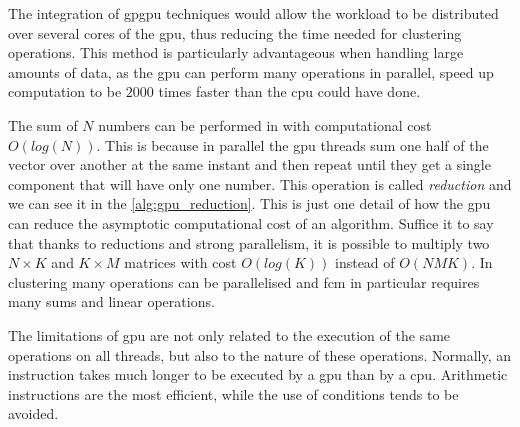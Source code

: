 \bigskip
The integration of \gls{gpgpu} techniques would allow the workload to be distributed over several cores of the \gls{gpu}, thus reducing the time needed for clustering operations. This method is particularly advantageous when handling large amounts of data, as the \gls{gpu} can perform many operations in parallel, speed up computation to be $2000$ times faster than the \gls{cpu} could have done.

\noindent The sum of $N$ numbers can be performed in with computational cost $O(log(N))$. This is because in parallel the \gls{gpu} threads sum one half of the vector over another at the same instant and then repeat until they get a single component that will have only one number. This operation is called \textit{reduction} and we can see it in the \cref{alg:gpu_reduction}. This is just one detail of how the \gls{gpu} can reduce the asymptotic computational cost of an algorithm. Suffice it to say that thanks to reductions and strong parallelism, it is possible to multiply two $N\times K$ and $K\times M$ matrices with cost $O(log(K))$ instead of $O(NMK)$. In clustering many operations can be parallelised and \gls{fcm} in particular requires many sums and linear operations.

\noindent The limitations of \gls{gpu} are not only related to the execution of the same operations on all threads, but also to the nature of these operations. Normally, an instruction takes much longer to be executed by a \gls{gpu} than by a \gls{cpu}. Arithmetic instructions are the most efficient, while the use of conditions tends to be avoided.


